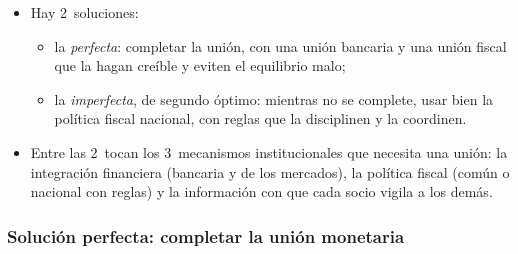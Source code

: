\documentclass[11pt]{article}
\begin{document}
\begin{itemize}
\item Hay 2~soluciones:
  \begin{itemize}
  \item la \emph{perfecta}: completar la unión, con una unión bancaria y una unión fiscal que la hagan creíble y eviten el equilibrio malo;
  \item la \emph{imperfecta}, de segundo óptimo: mientras no se complete, usar bien la política fiscal nacional, con reglas que la disciplinen y la coordinen.
  \end{itemize}
\item Entre las 2~tocan los 3~mecanismos institucionales que necesita una unión: la integración financiera (bancaria y de los mercados), la política fiscal (común o nacional con reglas) y la información con que cada socio vigila a los demás.
\end{itemize}

\subsubsection{Solución perfecta: completar la unión monetaria}\label{sec:completar}
\end{document}
